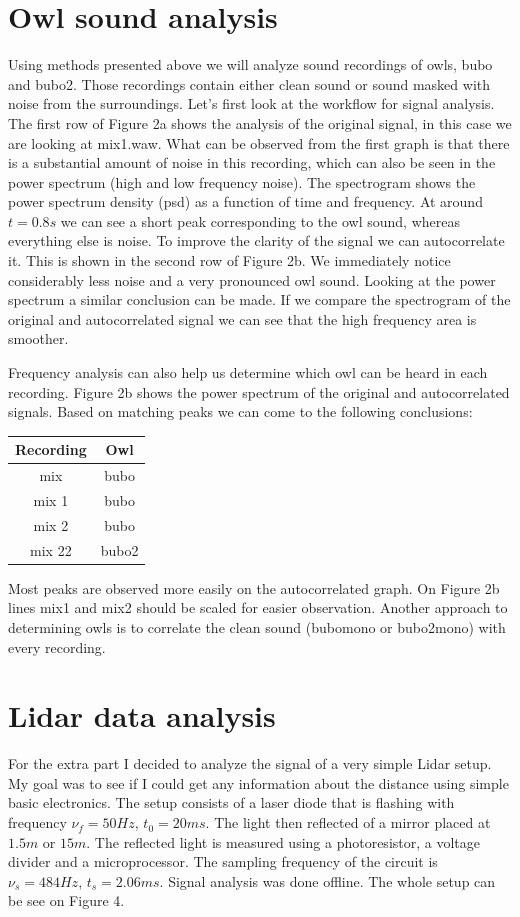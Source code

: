\documentclass[12pt, a4paper]{article}
\begin{document}
\section{Owl sound analysis}

Using methods presented above we will analyze sound recordings of owls, bubo and bubo2. Those recordings contain either clean sound or sound masked with noise from the surroundings. Let's first look at the workflow for signal analysis. The first row of Figure 2a shows the analysis of the original signal, in this case we are looking at mix1.waw. What can be observed from the first graph is that there is a substantial amount of noise in this recording, which can also be seen in the power spectrum (high and low frequency noise). The spectrogram shows the power spectrum density (psd) as a function of time and frequency. At around $t = 0.8s$ we can see a short peak corresponding to the owl sound, whereas everything else is noise. To improve the clarity of the signal we can autocorrelate it. This is shown in the second row of Figure 2b. We immediately notice considerably less noise and a very pronounced owl sound. Looking at the power spectrum a similar conclusion can be made. If we compare the spectrogram of the original and autocorrelated signal we can see that the high frequency area is smoother.

Frequency analysis can also help us determine which owl can be heard in each recording. Figure 2b shows the power spectrum of the original and autocorrelated signals. Based on matching peaks we can come to the following conclusions:

\begin{center}
  \begin{tabular}{ c c }
   Recording & Owl \\ 
   \hline
   mix & bubo \\
   mix 1 & bubo \\ 
   mix 2 & bubo \\
   mix 22 & bubo2
  \end{tabular}
\end{center}

Most peaks are observed more easily on the autocorrelated graph. On Figure 2b lines mix1 and mix2 should be scaled for easier observation. Another approach to determining owls is to correlate the clean sound (bubomono or bubo2mono) with every recording. 

\section{Lidar data analysis}
For the extra part I decided to analyze the signal of a very simple Lidar setup. My goal was to see if I could get any information about the distance using simple basic electronics. The setup consists of a laser diode that is flashing with frequency $\nu_f = 50 Hz$, $t_0 = 20 ms$. The light then reflected of a mirror placed at $1.5 m$ or $15 m$. The reflected light is measured using a photoresistor, a voltage divider and a microprocessor. The sampling frequency of the circuit is $\nu_s = 484 Hz$, $t_s = 2.06 ms$. Signal analysis was done offline. The whole setup can be see on Figure 4.
\end{document}
